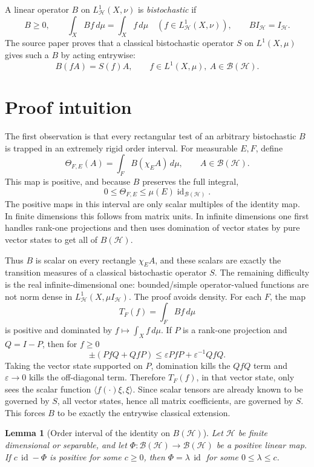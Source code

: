 \documentclass[11pt]{article}
\newtheorem{lemma}{Lemma}
\DeclareMathOperator{\id}{id}
\newcommand{\BH}{\mathcal B(\mathcal H)}
\newcommand{\HH}{\mathcal H}
\newcommand{\ip}[2]{\langle #1,#2\rangle}
\begin{document}
A linear operator \(B\) on \(L^1_{\HH}(X,\nu)\) is \emph{bistochastic} if
\[
 B\geq0,\qquad
 \int_X Bf\,d\mu=\int_X f\,d\mu\quad(f\in L^1_{\HH}(X,\nu)),
 \qquad
 B I_{\HH}= I_{\HH}.
\]
The source paper proves that a classical bistochastic operator \(S\) on
\(L^1(X,\mu)\) gives such a \(B\) by acting entrywise:
\[
       B(fA)=S(f)A,\qquad f\in L^1(X,\mu),\ A\in \BH.
\]

\section*{Proof intuition}

The first observation is that every rectangular test of an arbitrary
bistochastic \(B\) is trapped in an extremely rigid order interval.  For
measurable \(E,F\), define
\[
        \Theta_{F,E}(A)=\int_F B(\chi_E A)\,d\mu,\qquad A\in\BH .
\]
This map is positive, and because \(B\) preserves the full integral,
\[
        0\leq \Theta_{F,E}\leq \mu(E)\id_{\BH}.
\]
The positive maps in this interval are only scalar multiples of the identity
map.  In finite dimensions this follows from matrix units.  In infinite
dimensions one first handles rank-one projections and then uses domination of
vector states by pure vector states to get all of \(B(\HH)\).

Thus \(B\) is scalar on every rectangle \(\chi_E A\), and these scalars are
exactly the transition measures of a classical bistochastic operator \(S\).
The remaining difficulty is the real infinite-dimensional one: bounded/simple
operator-valued functions are not norm dense in \(L^1_{\HH}(X,\mu I_{\HH})\).
The proof avoids density.  For each \(F\), the map
\[
        T_F(f)=\int_F Bf\,d\mu
\]
is positive and dominated by \(f\mapsto\int_X f\,d\mu\).  If \(P\) is a
rank-one projection and \(Q=I-P\), then for \(f\geq0\)
\[
 \pm(PfQ+QfP)\leq \varepsilon PfP+\varepsilon^{-1}QfQ .
\]
Taking the vector state supported on \(P\), domination kills the \(QfQ\) term
and \(\varepsilon\to0\) kills the off-diagonal term.  Therefore \(T_F(f)\), in
that vector state, only sees the scalar function \(\ip{f(\cdot)\xi}{\xi}\).
Since scalar tensors are already known to be governed by \(S\), all vector
states, hence all matrix coefficients, are governed by \(S\).  This forces
\(B\) to be exactly the entrywise classical extension.

\begin{lemma}[Order interval of the identity on \(B(\HH)\)]\label{lem:order}
Let \(\HH\) be finite dimensional or separable, and let
\(\Phi:\BH\to\BH\) be a positive linear map.  If \(c\,\id-\Phi\) is positive
for some \(c\geq0\), then \(\Phi=\lambda\,\id\) for some
\(0\leq\lambda\leq c\).
\end{lemma}
\end{document}
